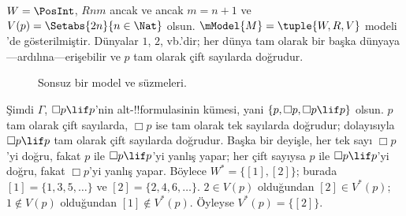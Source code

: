 \begin{ex}
  $W = \PosInt$, $Rnm$ ancak ve ancak $m = n + 1$ ve
  $V(p) = \Setabs{2n}{n \in \Nat}$ olsun. $\mModel{M} = \tuple{W, R, V}$
  modeli 'de gösterilmiştir. Dünyalar $1$, $2$,
  vb.'dir; her dünya tam olarak bir başka dünyaya---ardılına---erişebilir
  ve $p$ tam olarak çift sayılarda doğrudur.

  \begin{figure}
    \centering

    \caption{Sonsuz bir model ve süzmeleri.}
  \end{figure}

  Şimdi $\Gamma$, $\Box p \lif p$'nin alt-!!{formula}s{}inin kümesi, yani
  $\{p, \Box p, \Box p \lif p\}$ olsun. $p$ tam olarak çift sayılarda,
  $\Box p$ ise tam olarak tek sayılarda doğrudur; dolayısıyla
  $\Box p \lif p$ tam olarak çift sayılarda doğrudur. Başka bir deyişle,
  her tek sayı $\Box p$'yi doğru, fakat $p$ ile $\Box p \lif p$'yi yanlış
  yapar; her çift sayıysa $p$ ile $\Box p \lif p$'yi doğru, fakat
  $\Box p$'yi yanlış yapar. Böylece $W^* = \{ [1], [2] \}$; burada
  $[1] = \{1, 3, 5, \dots\}$ ve $[2] = \{2, 4, 6, \dots\}$.
  $2 \in V(p)$ olduğundan $[2] \in V^*(p)$; $1 \notin V(p)$ olduğundan
  $[1] \notin V^*(p)$. Öyleyse $V^*(p) = \{[2]\}$.


\end{ex}
